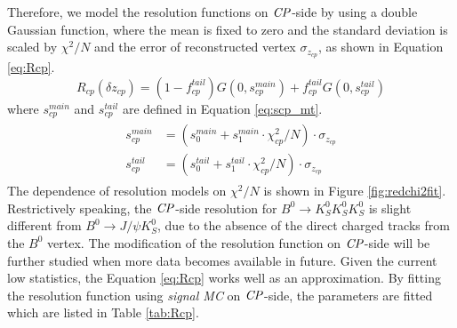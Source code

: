 Therefore, we model the resolution functions on $\it{CP}$-side by using a double Gaussian function, where the mean is fixed to zero and the standard deviation is scaled by $\chi^2/N$ and the error of reconstructed vertex $\sigma_{z_{cp}}$, as shown in Equation \ref{eq:Rcp}.
\begin{equation}\label{eq:Rcp}
R_{cp}(\delta z_{cp}) = (1-f_{cp}^{tail})G(0,s_{cp}^{main})+
f_{cp}^{tail}G(0,s_{cp}^{tail})
\end{equation} where $s_{cp}^{main}$ and $s_{cp}^{tail}$ are defined in Equation \ref{eq:scp_mt}.
\begin{eqnarray}\label{eq:scp_mt}
\begin{split}
s_{cp}^{main}&=(s_0^{main} + s_1^{main}\cdot \chi^2_{cp}/N )\cdot \sigma_{z_{cp}}\\
s_{cp}^{tail}&=(s_0^{tail} + s_1^{tail}\cdot \chi^2_{cp}/N )\cdot \sigma_{z_{cp}}
\end{split}
\end{eqnarray} 
The dependence of resolution models on $\chi^2/N$ is shown in Figure \ref{fig:redchi2fit}. Restrictively speaking, the $\it{CP}$-side resolution for $B^0 \to K_S^0  K_S^0  K_S^0$ is slight different from $B^0\to J/\psi K_S^0$, due to the absence of the direct charged tracks from the $B^0$ vertex. The modification of the resolution function on $\it{CP}$-side will be further studied when more data becomes available in future. Given the current low statistics, the Equation \ref{eq:Rcp} works well as an approximation. By fitting the resolution function using \textit{signal MC} on $\it{CP}$-side, the parameters are fitted which are listed in Table \ref{tab:Rcp}.
